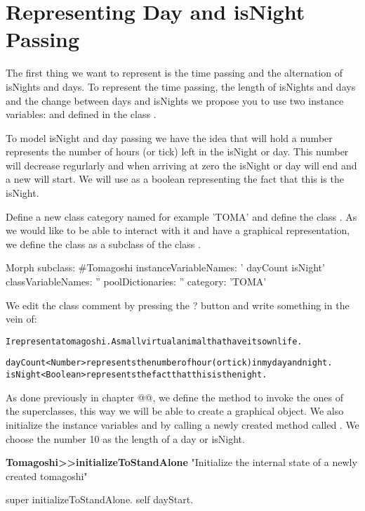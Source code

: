 \section{Representing Day and isNight Passing}
The first thing we want to represent is the time passing and the alternation of isNights and days.
To represent the time passing, the length of isNights and days and the change between days and isNights we propose you to use two instance variables:  and  defined in the class . 

To model isNight and day passing we have the idea that  will hold a number represents the number of hours (or tick) left in the isNight or day. This number will decrease regurlarly and when arriving at zero the isNight or day will end and a new will start. We will use  as a boolean  representing the fact that this is the isNight.

Define a new class category named for example 'TOMA' and define the class . As we would like to be able to interact with it and have a graphical representation, we define  the class   as a subclass of the class . 

\begin{classdef}\label{cls:tomaOne}
Morph subclass: #Tomagoshi
   instanceVariableNames: ' dayCount isNight'
   classVariableNames: ''
   poolDictionaries: ''
   category: 'TOMA'
\end{classdef}

We edit the class comment by pressing the ? button and write something in the vein of:
\begin{alltt}
I represent a tomagoshi. A small virtual animal that have its own life.

dayCount <Number> represents the number of hour (or tick) in my day and night.
isNight <Boolean> represents the fact that this is the night.
\end{alltt}


As done previously in chapter @@, we define the method  to invoke the ones of the superclasses, this way we will be able to create a graphical object. We also initialize the instance variables  and  by calling a newly created method called . We choose the number 10 as the length of a day or isNight. 


\begin{method}\label{mth:initOne}
\textbf{Tomagoshi>>initializeToStandAlone}
   "Initialize the internal state of a newly created tomagoshi"

   super initializeToStandAlone.
   self dayStart.
\end{method}

